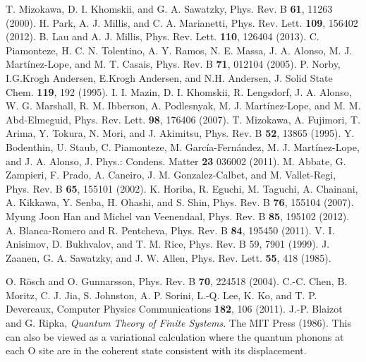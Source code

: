 \documentclass[showpacs,preprintnumbers,amsmath,amssymb,prl,aps,twocolumn,superscriptaddress]{revtex4}
\begin{document}
\begin{thebibliography}{99}
T. Mizokawa, D. I. Khomskii, and G. A. Sawatzky, 
Phys. Rev. B {\bf 61}, 11263 (2000).
H. Park, A. J. Millis, and C. A. Marianetti, Phys. Rev. Lett. {\bf 109}, 156402 (2012). 
B. Lau and A. J. Millis, Phys. Rev. Lett. {\bf 110}, 126404 (2013).
C. Piamonteze, H. C. N. Tolentino, A. Y. Ramos, N. E. Massa, J. A. Alonso, 
M. J. Mart{\'i}nez-Lope, and M. T. Casais, Phys. Rev. B {\bf 71}, 012104 (2005).  
P. Norby, I.G.Krogh Andersen, E.Krogh Andersen, and N.H. Andersen, 
J. Solid State Chem. {\bf 119}, 192 (1995).
I. I. Mazin, D. I. Khomskii, R. Lengsdorf, J. A. Alonso, W. G. Marshall, 
R. M. Ibberson, A. Podlesnyak, M. J. Mart{\'i}nez-Lope, and M. M. Abd-Elmeguid, 
Phys. Rev. Lett. {\bf 98}, 176406 (2007).
T. Mizokawa, A. Fujimori, T. Arima, Y. Tokura, N. Mori, 
and J. Akimitsu, Phys. Rev. B {\bf 52}, 13865 (1995). 
Y. Bodenthin, U. Staub, C. Piamonteze, M. Garc{\' i}a-Fern{\'a}ndez, 
M. J. Mart{\' i}nez-Lope, and J. A. Alonso, 
J. Phys.: Condens. Matter {\bf 23} 036002 (2011). 
M. Abbate, G. Zampieri, F. Prado, A. Caneiro, J. M. Gonzalez-Calbet, 
and M. Vallet-Regi, Phys. Rev. B {\bf 65}, 155101 (2002).
K. Horiba, R. Eguchi, M. Taguchi, A. Chainani, A. Kikkawa, Y. Senba, 
H. Ohashi, and S. Shin, Phys. Rev. B {\bf 76}, 155104 (2007). 
Myung Joon Han and Michel van Veenendaal, Phys. Rev. B {\bf  85}, 195102 (2012).
A. Blanca-Romero and R. Pentcheva, Phys. Rev. B {\bf 84}, 195450 (2011).
V. I. Anisimov, D. Bukhvalov, and T. M. Rice, 
Phys. Rev. B 59, 7901 (1999). 
J. Zaanen, G. A. Sawatzky, and J. W. Allen, Phys. Rev. Lett. {\bf 55}, 418 (1985).

O. R{\"o}sch and O. Gunnarsson, Phys. Rev. B {\bf 70}, 224518 (2004). 
C.-C. Chen, B. Moritz, C. J. Jia, S. Johnston, A. P. Sorini, L.-Q. Lee, K. Ko, 
and T. P. Devereaux, Computer Physics Communications {\bf 182}, 106 (2011). 
J.-P. Blaizot and G. Ripka, {\it Quantum Theory of Finite Systems}. 
The MIT Press (1986). 
 This can also be viewed as a variational calculation
  where the quantum phonons at each O site are in the coherent state
  consistent with its displacement.


\end{thebibliography}
\end{document}
